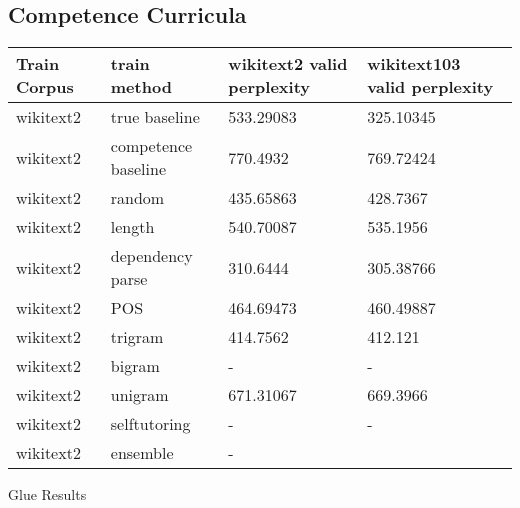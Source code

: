 \subsection{Competence Curricula}
\begin{table}[h!]
\tiny
\begin{tabular}{|l|l|l|l|} \hline
\textbf{Train Corpus} & \textbf{train method} &  \textbf{wikitext2 valid perplexity} & \textbf{wikitext103 valid perplexity} \\ \hline
wikitext2 & true baseline & 533.29083 & 325.10345 \\ \hline
wikitext2 & competence baseline & 770.4932 & 769.72424 \\ \hline
wikitext2 & random & 435.65863 & 428.7367 \\ \hline
wikitext2 & length & 540.70087 & 535.1956 \\ \hline
wikitext2 & dependency parse & 310.6444 & 305.38766 \\ \hline
wikitext2 & POS & 464.69473 & 460.49887 \\ \hline
wikitext2 & trigram & 414.7562 & 412.121 \\ \hline
wikitext2 & bigram & - & -\\ \hline
wikitext2 & unigram & 671.31067 & 669.3966 \\ \hline
wikitext2 & selftutoring & - & -  \\ \hline
wikitext2 & ensemble & - & \\ \hline
\end{tabular}
\label{table:corpuscurriculaperplexity}
\end{table}
Glue Results
